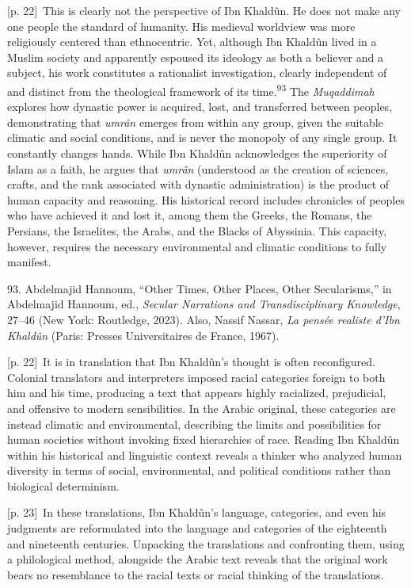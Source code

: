 \documentclass[10pt,a4paper]{article}
\begin{document}
{\scriptsize\color{gray} [p. 22]}\ This is clearly not the perspective of Ibn Khaldûn. He does not make any one people the standard of humanity. His medieval worldview was more religiously centered than ethnocentric. Yet, although Ibn Khaldûn lived in a Muslim society and apparently espoused its ideology as both a believer and a subject, his work constitutes a rationalist investigation, clearly independent of and distinct from the theological framework of its time.\nobreak\textsuperscript{93} The \textit{Muqaddimah} explores how dynastic power is acquired, lost, and transferred between peoples, demonstrating that \textit{umrân} emerges from within any group, given the suitable climatic and social conditions, and is never the monopoly of any single group. It constantly changes hands. While Ibn Khaldûn acknowledges the superiority of Islam as a faith, he argues that \textit{umrân} (understood as the creation of sciences, crafts, and the rank associated with dynastic administration) is the product of human capacity and reasoning. His historical record includes chronicles of peoples who have achieved it and lost it, among them the Greeks, the Romans, the Persians, the Israelites, the Arabs, and the Blacks of Abyssinia. This capacity, however, requires the necessary environmental and climatic conditions to fully manifest.\par{\small 93. Abdelmajid Hannoum, “Other Times, Other Places, Other Secularisms,” in Abdelmajid Hannoum, ed., \textit{Secular Narrations and Transdisciplinary Knowledge}, 27–46 (New York: Routledge, 2023). Also, Nassif Nassar, \textit{La pensée realiste d’Ibn Khaldûn} (Paris: Presses Universitaires de France, 1967).\par}
{\scriptsize\color{gray} [p. 22]}\ It is in translation that Ibn Khaldûn’s thought is often reconfigured. Colonial translators and interpreters imposed racial categories foreign to both him and his time, producing a text that appears highly racialized, prejudicial, and offensive to modern sensibilities. In the Arabic original, these categories are instead climatic and environmental, describing the limits and possibilities for human societies without invoking fixed hierarchies of race. Reading Ibn Khaldûn within his historical and linguistic context reveals a thinker who analyzed human diversity in terms of social, environmental, and political conditions rather than biological determinism.\par
{\scriptsize\color{gray} [p. 23]}\ In these translations, Ibn Khaldûn’s language, categories, and even his judgments are reformulated into the language and categories of the eighteenth and nineteenth centuries. Unpacking the translations and confronting them, using a philological method, alongside the Arabic text reveals that the original work bears no resemblance to the racial texts or racial thinking of the translations.\par
\end{document}
